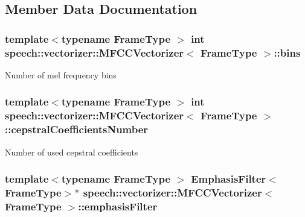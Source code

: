 \subsection{Member Data Documentation}
\hypertarget{classspeech_1_1vectorizer_1_1MFCCVectorizer_a179a54e359180354c417f980b222f1eb}{
\subsubsection[{bins}]{\setlength{\rightskip}{0pt plus 5cm}template$<$typename Frame\+Type $>$ int {\bf speech\+::vectorizer\+::\+M\+F\+C\+C\+Vectorizer}$<$ Frame\+Type $>$\+::bins\hspace{0.3cm}{\ttfamily [protected]}}}\label{classspeech_1_1vectorizer_1_1MFCCVectorizer_a179a54e359180354c417f980b222f1eb}
Number of mel frequency bins \hypertarget{classspeech_1_1vectorizer_1_1MFCCVectorizer_a5f5083150768e6c9aad1777502e59a58}{
\subsubsection[{cepstral\+Coefficients\+Number}]{\setlength{\rightskip}{0pt plus 5cm}template$<$typename Frame\+Type $>$ int {\bf speech\+::vectorizer\+::\+M\+F\+C\+C\+Vectorizer}$<$ Frame\+Type $>$\+::cepstral\+Coefficients\+Number\hspace{0.3cm}{\ttfamily [protected]}}}\label{classspeech_1_1vectorizer_1_1MFCCVectorizer_a5f5083150768e6c9aad1777502e59a58}
Number of used cepstral coefficients \hypertarget{classspeech_1_1vectorizer_1_1MFCCVectorizer_a36f6a48cc775f2b7d12f8fbfc103c448}{
\subsubsection[{emphasis\+Filter}]{\setlength{\rightskip}{0pt plus 5cm}template$<$typename Frame\+Type $>$ {\bf Emphasis\+Filter}$<$Frame\+Type$>$$\ast$ {\bf speech\+::vectorizer\+::\+M\+F\+C\+C\+Vectorizer}$<$ Frame\+Type $>$\+::emphasis\+Filter\hspace{0.3cm}{\ttfamily [protected]}}}\label{classspeech_1_1vectorizer_1_1MFCCVectorizer_a36f6a48cc775f2b7d12f8fbfc103c448}
